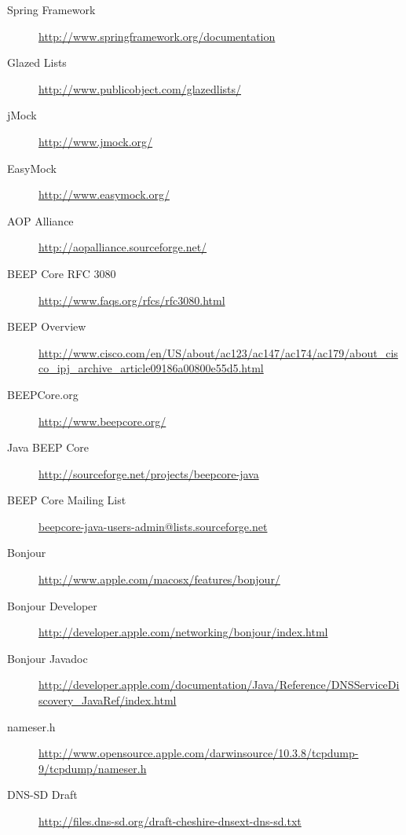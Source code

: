 \begin{description}
 \item[Spring Framework] \href{http://www.springframework.org/documentation}{http://www.springframework.org/documentation}
 \item[Glazed Lists] \href{http://www.publicobject.com/glazedlists/}{http://www.publicobject.com/glazedlists/}
 \item[jMock] \href{http://www.jmock.org/}{http://www.jmock.org/}
 \item[EasyMock] \href{http://www.easymock.org/}{http://www.easymock.org/}
 \item[AOP Alliance] \href{http://aopalliance.sourceforge.net/}{http://aopalliance.sourceforge.net/}
  \item[BEEP Core RFC 3080] \href{http://www.faqs.org/rfcs/rfc3080.html}{http://www.faqs.org/rfcs/rfc3080.html}
 \item[BEEP Overview] \href{http://www.cisco.com/en/US/about/ac123/ac147/ac174/ac179/about\_cisco\_ip\j_archive\_article09186a00800e55d5.html}{http://www.cisco.com/en/US/about/ac123/ac147/ac174/ac179/about\_cisco\_ipj\_archive\_article09186a00800e55d5.html}
 \item[BEEPCore.org] \href{http://www.beepcore.org/}{http://www.beepcore.org/}
 \item[Java BEEP Core] \href{http://sourceforge.net/projects/beepcore-java}{http://sourceforge.net/projects/beepcore-java}
 \item[BEEP Core Mailing List] \href{beepcore-java-users-admin@lists.sourceforge.net}{beepcore-java-users-admin@lists.sourceforge.net}
 \item[Bonjour] \href{http://www.apple.com/macosx/features/bonjour/}{http://www.apple.com/macosx/features/bonjour/}
 \item[Bonjour Developer] \href{http://developer.apple.com/networking/bonjour/index.html}{http://developer.apple.com/networking/bonjour/index.html}
 \item[Bonjour Javadoc] \href{http://developer.apple.com/documentation/Java/Reference/DNSServiceDiscovery\_JavaRef/index.html}{http://developer.apple.com/documentation/Java/Reference/DNSServiceDiscovery\_JavaRef/index.html}
 \item[nameser.h] \href{http://www.opensource.apple.com/darwinsource/10.3.8/tcpdump-9/tcpdump/nameser.h}{http://www.opensource.apple.com/darwinsource/10.3.8/tcpdump-9/tcpdump/nameser.h} 
 \item[DNS-SD Draft] \href{http://files.dns-sd.org/draft-cheshire-dnsext-dns-sd.txt}{http://files.dns-sd.org/draft-cheshire-dnsext-dns-sd.txt}

\end{description}
